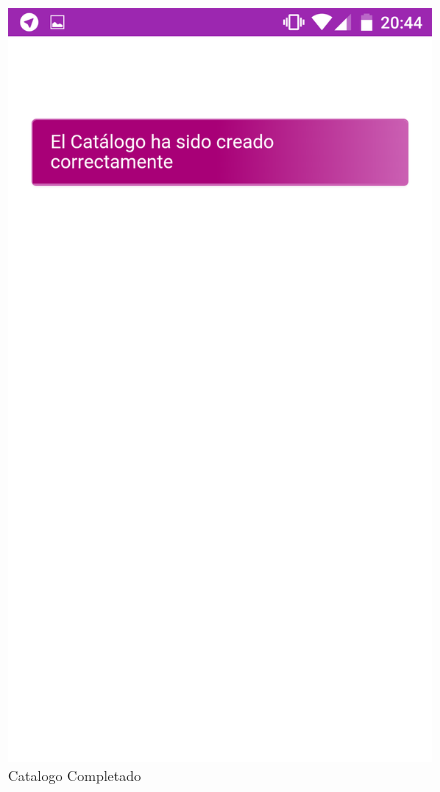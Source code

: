 \documentclass[a4paper,11pt]{book}
\begin{document}
\begin{figure}[H]
  \includegraphics[width=\linewidth]{imagenes/pruebas/movil/movil11.png}
  \caption{Catalogo Completado\cite{propio}}
\endminipage\hfill
{}

\end{figure}
\end{document}
